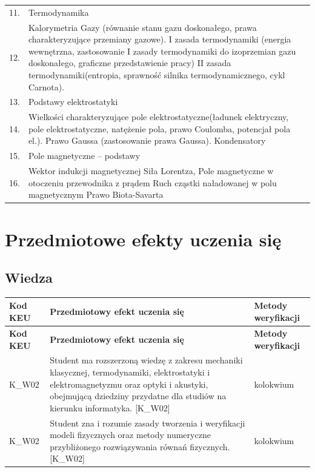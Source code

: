 \documentclass[12pt, a4paper]{article}
\newcommand{\thdrule}{\noalign{\global\setlength{\extrarowheight}{0pt}}}
\newcommand{\thdend}{\noalign{\global\setlength{\extrarowheight}{3pt}}}
\begin{document}
{\begin{longtable}{m{1.5cm}m{14.5cm}}
  \rowcolor{tableRowLight} 11. & Termodynamika \\
  \rowcolor{tableRowAlt} 12. & Kalorymetria Gazy (równanie stanu gazu doskonałego, prawa charakteryzujące przemiany gazowe). I zasada termodynamiki (energia wewnętrzna, zastosowanie I zasady termodynamiki do izoprzemian gazu doskonałego, graficzne przedstawienie pracy) II zasada termodynamiki(entropia, sprawność silnika termodynamicznego, cykl Carnota). \\
  \rowcolor{tableRowLight} 13. & Podstawy elektrostatyki \\
  \rowcolor{tableRowAlt} 14. & Wielkości charakteryzujące pole elektrostatyczne(ładunek elektryczny, pole elektrostatyczne, natężenie pola, prawo Coulomba, potencjał pola el.). Prawo Gaussa (zastosowanie prawa Gaussa). Kondensatory \\
  \rowcolor{tableRowLight} 15. & Pole magnetyczne – podstawy \\
  \rowcolor{tableRowAlt} 16. & Wektor indukcji magnetycznej Siła Lorentza, Pole magnetyczne w otoczeniu przewodnika z prądem Ruch cząstki naładowanej w polu magnetycznym Prawo Biota-Savarta \\
\bottomrule
\end{longtable}}

\section{Przedmiotowe efekty uczenia się}

\subsection*{Wiedza}
{\scriptsize
\begin{longtable}{m{1.6cm}m{9.0cm}m{4.2cm}}
\thdrule\toprule
\rowcolor{pjatkRed} {\color{white}\footnotesize\textbf{\vphantom{Ag}Kod KEU}} & {\color{white}\footnotesize\textbf{\vphantom{Ag}Przedmiotowy efekt uczenia się}} & {\color{white}\footnotesize\textbf{\vphantom{Ag}Metody weryfikacji}} \\
\midrule\thdend
\endfirsthead
\thdrule\toprule
\rowcolor{pjatkRed} {\color{white}\footnotesize\textbf{\vphantom{Ag}Kod KEU}} & {\color{white}\footnotesize\textbf{\vphantom{Ag}Przedmiotowy efekt uczenia się}} & {\color{white}\footnotesize\textbf{\vphantom{Ag}Metody weryfikacji}} \\
\midrule\thdend
\endhead
  \rowcolor{tableRowLight} K\_W02 & Student ma rozszerzoną wiedzę z zakresu mechaniki klasycznej, termodynamiki, elektrostatyki i elektromagnetyzmu oraz optyki i akustyki, obejmującą dziedziny przydatne dla studiów na kierunku informatyka. {[}K\_W02{]} & kolokwium \\
  \rowcolor{tableRowAlt} K\_W02 & Student zna i rozumie zasady tworzenia i weryfikacji modeli fizycznych oraz metody numeryczne przybliżonego rozwiązywania równań fizycznych. {[}K\_W02{]} & kolokwium \\
\bottomrule
\end{longtable}}
\end{document}
